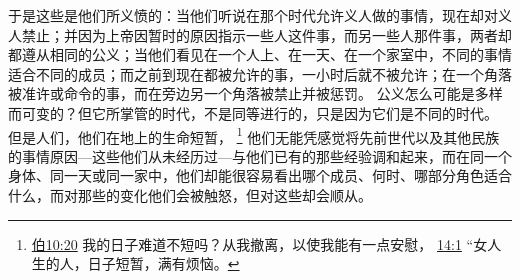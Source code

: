 \documentclass[12pt, a4paper, oneside]{ctexart}
\begin{document}
    于是这些是他们所义愤的：当他们听说在那个时代允许义人做的事情，现在却对义人禁止；并因为上帝因暂时的原因指示一些人这件事，而另一些人那件事，两者却都遵从相同的公义；当他们看见在一个人上、在一天、在一个家室中，不同的事情适合不同的成员；而之前到现在都被允许的事，一小时后就不被允许；在一个角落被准许或命令的事，而在旁边另一个角落被禁止并被惩罚。
    公义怎么可能是多样而可变的？但它所掌管的时代，不是同等进行的，只是因为它们是不同的时代。
    但是人们，他们在地上的生命短暂，
    \footnote {
		\href{https://biblehub.com/job/10-20.htm}{伯10:20} 我的日子难道不短吗？从我撤离，以使我能有一点安慰，
        \href{https://biblehub.com/job/14-1.htm}{14:1} “女人生的人，日子短暂，满有烦恼。
	}
    他们无能凭感觉将先前世代以及其他民族的事情原因---这些他们从未经历过---与他们已有的那些经验调和起来，而在同一个身体、同一天或同一家中，他们却能很容易看出哪个成员、何时、哪部分角色适合什么，而对那些的变化他们会被触怒，但对这些却会顺从。
\end{document}
